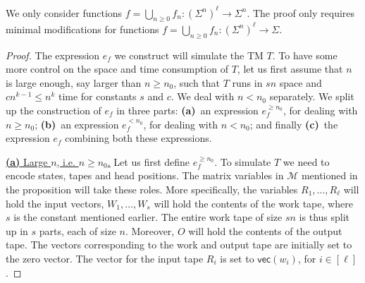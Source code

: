 We only consider functions $f=\bigcup_{n\geq 0}f_n:(\Sigma^n)^\ell\to \Sigma^n$. The proof only requires
minimal modifications for functions  $f=\bigcup_{n\geq 0}f_n:(\Sigma^n)^\ell\to \Sigma$.

\begin{proof}
	The expression $e_f$ we construct will simulate the TM $T$. To have some more control on the space 
	and time consumption of $T$, let us first assume that $n$ is large enough, say larger than $n\geq n_0$, 
	such that $T$ runs in $sn$ space and $cn^{k-1}\leq n^k$ time for constants $s$ and $c$. We deal with $n<n_0$ separately.
 We split up the construction of $e_f$ in three
	parts: \textbf{(a)}~an expression $e_f^{\geq n_0}$, for dealing with $n\geq n_0$; \textbf{(b)}~an expression
	$e_f^{<n_0}$, for dealing with $n<n_0$; and finally \textbf{(c)}~the expression $e_f$ combining both these expressions. 
	
\medskip
\noindent
\underline{\textbf{(a)} Large $n$, i.e. $n\geq n_0$.}
    Let us first define $e_f^{\geq n_0}$. 
    To simulate $T$ we need to encode states, tapes and head positions. The matrix variables in 
    $\mathcal{M}$ mentioned in the proposition will take these roles. More specifically, the variables 
    $R_1,\ldots,R_\ell$ will hold the input vectors, $W_1,\ldots,W_s$ will hold the contents of the work
    tape, where $s$ is the constant mentioned earlier.
	The entire work tape of size $sn$ is thus split up in $s$ parts, each of size $n$.
	Moreover, $O$ will hold the contents of the output tape. 
	The vectors corresponding to the work and output tape are initially set to the zero vector. 
    The vector for the input tape $R_i$ is set to $\mathsf{vec}(w_i)$, for $i\in[\ell]$.


\end{proof}
